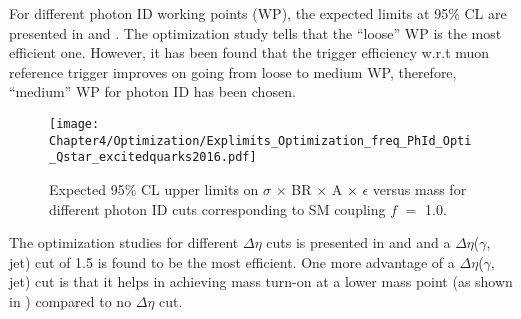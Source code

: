 For different photon ID working points (WP), the expected limits at 95$\%$ CL are presented in \fig{\ref{fig:PhIDOpti}} and \tab{\ref{Table:PhIDOpti}}. 
The optimization study tells that the ``loose'' WP is the most efficient one. However, it has been found that the trigger efficiency w.r.t muon reference trigger
improves on going from loose to medium WP, therefore, ``medium'' WP for photon ID has been chosen. 

\vspace{-0.1in}
\begin{table}[htbp]
  \begin{minipage}{0.54\textwidth}
    \begin{figure}[H]
      \texttt{[image: Chapter4/Optimization/Explimits\_Optimization\_freq\_PhId\_Opti\_Qstar\_excitedquarks2016.pdf]}
      \caption{Expected 95$\%$ CL upper limits on $\sigma$ $\times$ BR $\times$ A $\times$ $\epsilon$ versus \qstar mass
        for different photon ID cuts corresponding to SM coupling $f$ $=$ 1.0.}
      \label{fig:PhIDOpti}
    \end{figure}
  \end{minipage}%
  \hfill
  \begin{minipage}{0.44\textwidth}
    \centering
    \caption{Photon ID cut optimization corresponding to different mass expected limits.}
    \label{Table:PhIDOpti}
  \end{minipage}
\end{table}
\vspace{-0.1in}

The optimization studies for different $\Delta\eta$ cuts is presented in \fig{\ref{fig:DEtaOpti}} and \tab{\ref{Table:DEtaOpti}} and
a $\Delta\eta$($\gamma$, jet) cut of 1.5 is found to be the most efficient. One more advantage of a $\Delta\eta$($\gamma$, jet)
cut is that it helps in achieving mass turn-on at a lower mass point (as shown in \fig{\ref{fig:MassTurnOn}}) compared to no $\Delta\eta$ cut.  

